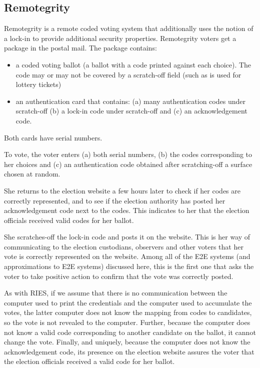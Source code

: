 \subsection{Remotegrity~\cite{zagorski2013}}

Remotegrity is a remote coded voting system that additionally uses the
notion of a lock-in to provide additional security properties. Remotegrity
voters get a package in the postal mail. The package contains:
\begin{itemize}
  \item a coded voting ballot (a ballot with a code printed against each
    choice). The code may or may not be covered by a scratch-off field (such
    as is used for lottery tickets)
  \item an authentication card that contains: (a) many authentication codes
    under scratch-off (b) a lock-in code under scratch-off and (c) an
    acknowledgement code.
\end{itemize}
Both cards have serial numbers.

To vote, the voter enters (a) both serial numbers, (b) the codes
corresponding to her choices and (c) an authentication code obtained after
scratching-off a surface chosen at random.

She returns to the election website a few hours later to check if her codes
are correctly represented, and to see if the election authority has posted
her acknowledgement code next to the codes. This indicates to her that the
election officials received valid codes for her ballot.

She scratches-off the lock-in code and posts it on the website. This is her
way of communicating to the election custodians, observers and other voters
that her vote is correctly represented on the website. Among all of the E2E
systems (and approximations to E2E systems) discussed here, this is the
first one that asks the voter to take positive action to confirm that the
vote was correctly posted.

As with RIES, if we assume that there is no communication between the
computer used to print the credentials and the computer used to accumulate
the votes, the latter computer does not know the mapping from codes to
candidates, so the vote is not revealed to the computer. Further, because
the computer does not know a valid code corresponding to another candidate
on the ballot, it cannot change the vote.  Finally, and uniquely, because
the computer does not know the acknowledgement code, its presence on the
election website assures the voter that the election officials received a
valid code for her ballot.


